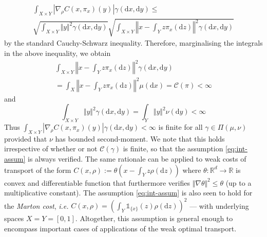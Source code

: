 \documentclass[leqno, 11pt, a4paper]{amsart}
\theoremstyle{definition}
\newcommand{\R}{\mathbb{R}}
\newcommand{\C}{\mathscr{C}}
\newcommand{\dd}{\mathrm{d}}
\begin{document}
\begin{multline*}
\int_{X \times Y} |\nabla_\rho C(x, \pi_x)(y)|  \gamma(\dd x,\dd y) \leq \\ \sqrt{\int_{X \times Y} \Vert y \Vert^2  \gamma(\dd x,\dd y)} \sqrt{\int_{X \times Y} \left\Vert x - \int_{Y} z \pi_x(\dd z) \right\Vert^2\gamma(\dd x, \dd y)}
\end{multline*}
by the standard Cauchy-Schwarz inequality. Therefore, marginalising the integrals in the above inequality, we obtain
\begin{multline*}
\int_{X \times Y} \left\Vert x - \int_{Y} z \pi_x(\dd z) \right\Vert^2  \gamma(\dd x,\dd y) \\ = \int_{X} \left\Vert x - \int_{Y} z \pi_x(\dd z) \right\Vert^2 \mu(\dd x) = \C(\pi) < \infty
\end{multline*}
and 
$$
\int_{X \times Y} \Vert y \Vert^2  \gamma(\dd x,\dd y) = \int_{Y} \Vert y \Vert^2 \nu(\dd y) < \infty
$$
Thus $\int_{X \times Y} |\nabla_\rho C(x, \pi_x)(y)|  \gamma(\dd x, \dd y) < \infty$ is finite for all $\gamma \in \Pi(\mu, \nu)$ provided that $\nu$ has bounded second-moment. We note that this holds irrespective of whether or not $\C(\gamma)$ is finite, so that the assumption \eqref{eq:int-assum} is always verified. The same rationale can be applied to weak costs of transport of the form $C(x, \rho) := \theta(x - \int_{Y} z \rho(\dd z))$ where $\theta : \R^d \to \R$ is convex and differentiable  function that furthermore verifies $\Vert \nabla \theta \Vert^2 \leq \theta$ (up to a multiplicative constant). The assumption \eqref{eq:int-assum} is also seen to hold for the \textit{Marton cost}, \textit{i.e.} $C(x, \rho) = (\int_{Y} \mathds{1}_{\{x\}}(z) \rho(\dd z))^2$ — with underlying spaces $X = Y = [0,1]$. Altogether, this assumption is general enough to encompass important cases of applications of the weak optimal transport.
\end{document}
